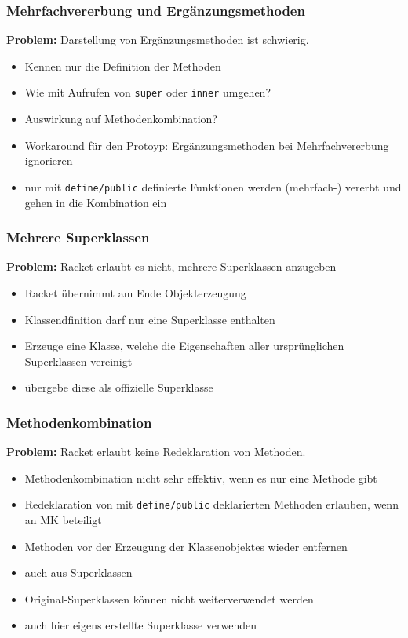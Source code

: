 \documentclass{beamer}
\begin{document}
\begin{frame}
 \frametitle{Mehrfachvererbung und Ergänzungsmethoden}
 \textbf{Problem:} Darstellung von Ergänzungsmethoden ist schwierig.
 \vspace{0.5cm}
 \begin{itemize}
  \item Kennen nur die Definition der Methoden
  \item Wie mit Aufrufen von \texttt{super} oder \texttt{inner} umgehen?
  \item Auswirkung auf Methodenkombination?
  \item[\textbf{\textrightarrow}] Workaround für den Protoyp: Ergänzungsmethoden bei Mehrfachvererbung ignorieren
  \item[\textbf{\textrightarrow}] nur mit \texttt{define/public} definierte Funktionen werden (mehrfach-) vererbt und gehen in die Kombination ein
 \end{itemize}
\end{frame}

\begin{frame}
 \frametitle{Mehrere Superklassen}
 \textbf{Problem:} Racket erlaubt es nicht, mehrere Superklassen anzugeben
 \vspace{0.5cm}
 \begin{itemize}
  \item Racket übernimmt am Ende Objekterzeugung 
  \item Klassendfinition darf nur eine Superklasse enthalten
  \item[\textbf{\textrightarrow}] Erzeuge eine Klasse, welche die Eigenschaften aller ursprünglichen Superklassen vereinigt
  \item[\textbf{\textrightarrow}] übergebe diese als offizielle Superklasse
 \end{itemize}
\end{frame}

\begin{frame}
 \frametitle{Methodenkombination}
  \textbf{Problem:} Racket erlaubt keine Redeklaration von Methoden.
   \vspace{0.5cm}
  \begin{itemize}
   \item Methodenkombination nicht sehr effektiv, wenn es nur eine Methode gibt
   \item[\textbf{\textrightarrow}] Redeklaration von mit \texttt{define/public} deklarierten Methoden erlauben, wenn an MK beteiligt
   \item Methoden vor der Erzeugung der Klassenobjektes wieder entfernen
   \item auch aus Superklassen
   \item Original-Superklassen können nicht weiterverwendet werden
   \item[\textbf{\textrightarrow}] auch hier eigens erstellte Superklasse verwenden
  \end{itemize}
\end{frame}
\end{document}
